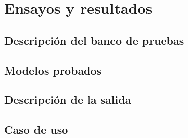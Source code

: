 
\chapter{Ensayos y resultados} %

\label{Chapter4} %


\section{Descripción del banco de pruebas}
\label{sec:pruebasHW}

\section{Modelos probados}
\section{Descripción de la salida}
\section{Caso de uso}

